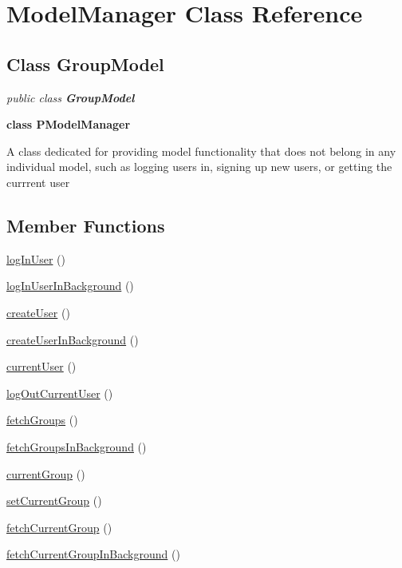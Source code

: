 
\hypertarget{class_ModelManager.iOS}{\section{ModelManager Class Reference}
\label{class_ModelManager.iOS}
}

\subsection*{Class GroupModel}

\textit{public class \textbf{ GroupModel}}

\tab \textbf{class PModelManager}

A class dedicated for providing model functionality that does not belong in any individual model, such as logging users in, signing up new users, or getting the currrent user\\


\subsection*{Member Functions}
\begin{DoxyCompactItemize}
\item 
\hyperlink{class_ModelManager.iOS.logInUser}{logInUser} ()
\item 
\hyperlink{class_ModelManager.iOS.logInUserInBackground}{logInUserInBackground} ()
\item 
\hyperlink{class_ModelManager.iOS.createUser}{createUser} ()
\item 
\hyperlink{class_ModelManager.iOS.createUserInBackground}{createUserInBackground} ()
\item 
\hyperlink{class_ModelManager.iOS.currentUser}{currentUser} ()
\item 
\hyperlink{class_ModelManager.iOS.logOutCurrentUser}{logOutCurrentUser} ()
\item 
\hyperlink{class_ModelManager.iOS.fetchGroups}{fetchGroups} ()
\item 
\hyperlink{class_ModelManager.iOS.fetchGroupsInBackground}{fetchGroupsInBackground} ()
\item 
\hyperlink{class_ModelManager.iOS.currentGroup}{currentGroup} ()
\item 
\hyperlink{class_ModelManager.iOS.setCurrentGroup}{setCurrentGroup} ()
\item 
\hyperlink{class_ModelManager.iOS.fetchCurrentGroup}{fetchCurrentGroup} ()
\item 
\hyperlink{class_ModelManager.iOS.fetchCurrentGroupInBackground}{fetchCurrentGroupInBackground} ()

\end{DoxyCompactItemize}




